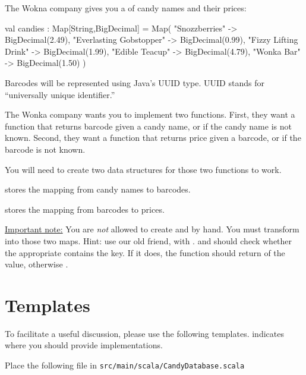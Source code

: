 \documentclass{book}
\begin{document}
The Wokna company gives you a  of candy names and their prices:

\begin{scalacode}
val candies : Map[String,BigDecimal] = Map(
  "Snozzberries" -> BigDecimal(2.49),
  "Everlasting Gobstopper" -> BigDecimal(0.99),
  "Fizzy Lifting Drink" -> BigDecimal(1.99),
  "Edible Teacup" -> BigDecimal(4.79),
  "Wonka Bar" -> BigDecimal(1.50)
)
\end{scalacode}

Barcodes will be represented using Java's UUID type.  UUID stands for ``universally unique identifier.''

The Wonka company wants you to implement two functions.  First, they want a function  that returns  barcode given a candy name, or  if the candy name is not known.  Second, they want a function  that returns  price given a barcode, or  if the barcode is not known.

You will need to create two  data structures for those two functions to work.

 stores the mapping from candy names to barcodes.

 stores the mapping from barcodes to prices.

\underline{Important note:} You are \emph{not} allowed to create  and  by hand.  You must transform  into those two maps.  Hint: use our old friend,  with .   and  should check whether the appropriate  contains the key.  If it does, the function should return  of the value, otherwise .

\section{Templates}

To facilitate a useful discussion, please use the following templates.   indicates where you should provide implementations.

Place the following file in \texttt{src/main/scala/CandyDatabase.scala}
\end{document}
